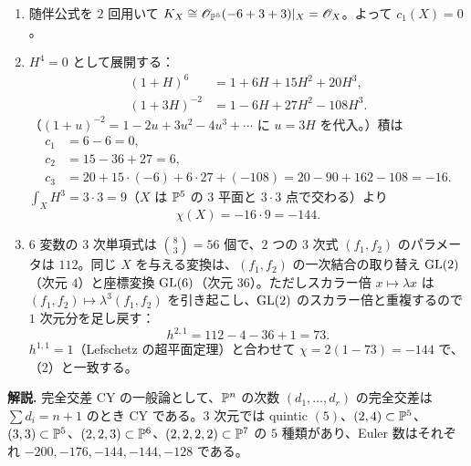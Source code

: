 \begin{enumerate}
  \item 随伴公式を $2$ 回用いて $K_X\cong\mathscr{O}_{\mathbb{P}^5}(-6+3+3)|_X=\mathscr{O}_X$。よって $c_1(X)=0$。
  \item $H^4=0$ として展開する：
  \begin{align*}
    (1+H)^6&=1+6H+15H^2+20H^3,\\
    (1+3H)^{-2}&=1-6H+27H^2-108H^3.
  \end{align*}
  （$(1+u)^{-2}=1-2u+3u^2-4u^3+\cdots$ に $u=3H$ を代入。）積は
  \begin{align*}
    c_1&=6-6=0,\\
    c_2&=15-36+27=6,\\
    c_3&=20+15\cdot(-6)+6\cdot27+(-108)=20-90+162-108=-16.
  \end{align*}
  $\int_XH^3=3\cdot3=9$（$X$ は $\mathbb{P}^5$ の $3$ 平面と $3\cdot3$ 点で交わる）より
  \[
    \chi(X)=-16\cdot9=-144.
  \]
  \item $6$ 変数の $3$ 次単項式は $\binom{8}{3}=56$ 個で、$2$ つの $3$ 次式 $(f_1,f_2)$ のパラメータは $112$。同じ $X$ を与える変換は、$(f_1,f_2)$ の一次結合の取り替え $\operatorname{GL}(2)$（次元 $4$）と座標変換 $\operatorname{GL}(6)$（次元 $36$）。ただしスカラー倍 $x\mapsto\lambda x$ は $(f_1,f_2)\mapsto\lambda^3(f_1,f_2)$ を引き起こし、$\operatorname{GL}(2)$ のスカラー倍と重複するので $1$ 次元分を足し戻す：
  \[
    h^{2,1}=112-4-36+1=73.
  \]
  $h^{1,1}=1$（Lefschetz の超平面定理）と合わせて $\chi=2(1-73)=-144$ で、（2）と一致する。
\end{enumerate}
\textbf{解説.} 完全交差 CY の一般論として、$\mathbb{P}^{n}$ の次数 $(d_1,\dots,d_r)$ の完全交差は $\sum d_i=n+1$ のとき CY である。$3$ 次元では quintic $(5)$、$(2,4)\subset\mathbb{P}^5$、$(3,3)\subset\mathbb{P}^5$、$(2,2,3)\subset\mathbb{P}^6$、$(2,2,2,2)\subset\mathbb{P}^7$ の $5$ 種類があり、Euler 数はそれぞれ $-200,-176,-144,-144,-128$ である。

